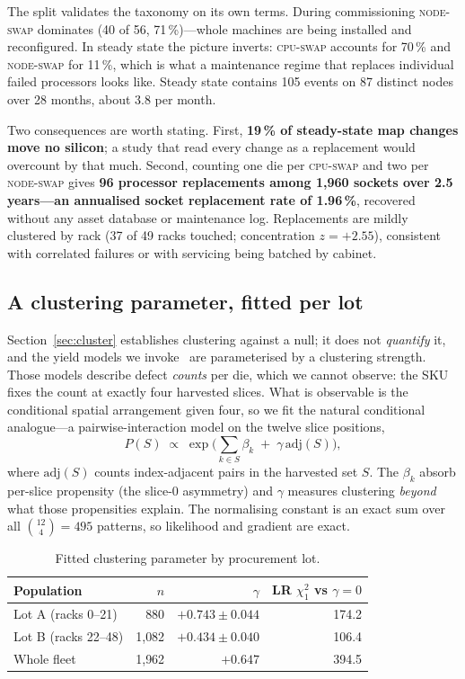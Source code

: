 \documentclass[10pt,conference]{IEEEtran}
\begin{document}
The split validates the taxonomy on its own terms. During commissioning \textsc{node-swap}
dominates (40 of 56, 71\,\%)---whole machines are being installed and reconfigured. In steady state
the picture inverts: \textsc{cpu-swap} accounts for 70\,\% and \textsc{node-swap} for 11\,\%,
which is what a maintenance regime that replaces individual failed processors looks like. Steady
state contains 105 events on 87 distinct nodes over 28 months, about 3.8 per month.

Two consequences are worth stating. First, \textbf{19\,\% of steady-state map changes move no
silicon}; a study that read every change as a replacement would overcount by that much. Second,
counting one die per \textsc{cpu-swap} and two per \textsc{node-swap} gives \textbf{96 processor
replacements among 1{,}960 sockets over 2.5 years---an annualised socket replacement rate of
1.96\,\%}, recovered without any asset database or maintenance log. Replacements are mildly
clustered by rack (37 of 49 racks touched; concentration $z=+2.55$), consistent with correlated
failures or with servicing being batched by cabinet.

\subsection{A clustering parameter, fitted per lot}
\label{sec:yield}
Section~\ref{sec:cluster} establishes clustering against a null; it does not \emph{quantify} it,
and the yield models we invoke~\cite{koren1993negbinom,bae2007waferyield} are parameterised by a
clustering strength. Those models describe defect \emph{counts} per die, which we cannot observe:
the SKU fixes the count at exactly four harvested slices. What is observable is the conditional
spatial arrangement given four, so we fit the natural conditional analogue---a pairwise-interaction
model on the twelve slice positions,
\[
  P(S)\;\propto\;\exp\Big(\textstyle\sum_{k\in S}\beta_k \;+\; \gamma\,\mathrm{adj}(S)\Big),
\]
where $\mathrm{adj}(S)$ counts index-adjacent pairs in the harvested set $S$. The $\beta_k$ absorb
per-slice propensity (the slice-0 asymmetry) and $\gamma$ measures clustering \emph{beyond} what
those propensities explain. The normalising constant is an exact sum over all
$\binom{12}{4}=495$ patterns, so likelihood and gradient are exact.

\begin{table}[h]\centering\caption{Fitted clustering parameter by procurement lot.}
\label{tab:yield}
\begin{tabular}{lrrr}\toprule
Population & $n$ & $\gamma$ & LR $\chi^2_1$ vs $\gamma{=}0$\\\midrule
Lot A (racks 0--21)  & 880 & $+0.743\pm0.044$ & 174.2\\
Lot B (racks 22--48) & 1{,}082 & $+0.434\pm0.040$ & 106.4\\
Whole fleet          & 1{,}962 & $+0.647$ & 394.5\\
\bottomrule\end{tabular}\end{table}
\end{document}
